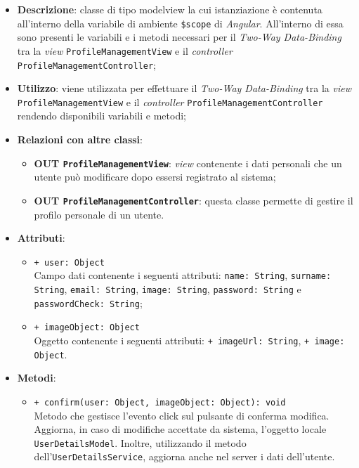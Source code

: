 	\begin{itemize}
		\item \textbf{Descrizione}: classe di tipo modelview la cui istanziazione è contenuta all'interno della variabile di ambiente \texttt{\$scope} di \textit{Angular}. All'interno di essa sono presenti le variabili e i metodi necessari per il \textit{Two-Way Data-Binding} tra la \textit{view} \texttt{ProfileManagementView} e il \textit{controller} \texttt{ProfileManagementController};
		\item \textbf{Utilizzo}: viene utilizzata per effettuare il \textit{Two-Way Data-Binding} tra la \textit{view} \\\texttt{ProfileManagementView} e il \textit{controller} \texttt{ProfileManagementController} rendendo disponibili variabili e metodi;
		\item \textbf{Relazioni con altre classi}: 
		\begin{itemize}
			\item \textbf{OUT \texttt{ProfileManagementView}}: \textit{view} contenente i dati personali che un utente può modificare dopo essersi registrato al sistema; 
			\item \textbf{OUT \texttt{ProfileManagementController}}: questa classe permette di gestire il profilo personale di un utente.
		\end{itemize}
		\item \textbf{Attributi}: 
		\begin{itemize}
			\item \texttt{+ user: Object} \\ Campo dati contenente i seguenti attributi: \texttt{name: String}, \texttt{surname: String}, \texttt{email: String}, \texttt{image: String}, \texttt{password: String} e \texttt{passwordCheck: String};
			\item \texttt{+ imageObject: Object} \\ Oggetto contenente i seguenti attributi: \texttt{+ imageUrl: String}, \texttt{+ image: Object}.
		\end{itemize}
		\item \textbf{Metodi}: 
		\begin{itemize}
			\item \texttt{+ confirm(user: Object, imageObject: Object): void} \\
			Metodo che gestisce l’evento click sul pulsante di conferma modifica. Aggiorna, in caso di modifiche accettate da sistema, l'oggetto locale \texttt{UserDetailsModel}. Inoltre, utilizzando il metodo dell'\texttt{UserDetailsService}, aggiorna anche nel server i dati dell'utente.
		\end{itemize}
	\end{itemize}	


